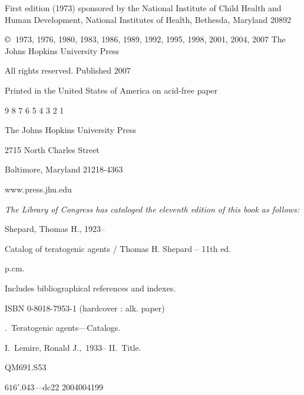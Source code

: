 \clearpage



\thispagestyle{empty}
\begingroup
\parindent0pt
\def\baselinestretch{1.15}
\mediumlarge
\vspace*{56pt}  %
First edition (1973) sponsored by the National Institute of 
Child Health and Human Development, National Institutes of Health,
Bethesda, Maryland 20892
\vspace{1pc}

$\copyright$\ 1973, 1976, 1980, 1983, 1986, 1989, 1992, 1995, 1998, 2001, 2004, 2007
The Johns Hopkins University Press

All rights reserved.  Published 2007

Printed in the United States of America on acid-free paper

9 8 7 6 5 4 3 2 1

\vspace{1pc}

The Johns Hopkins University Press

2715 North Charles Street

Baltimore, Maryland 21218-4363

www.press.jhu.edu

\vspace{1pc}

{\it The Library of Congress has cataloged the eleventh edition of this book as
follows: }

\vspace{4pt}

Shepard, Thomas H., 1923--

\emspace Catalog of teratogenic agents / Thomas H. Shepard -- 11th ed.

\emspace \emspace p.\emspace\emspace cm.

\emspace Includes bibliographical references and indexes.

\emspace ISBN 0-8018-7953-1 (hardcover : alk. paper)

.~Teratogenic agents---Catalogs.

                I.~Lemire, Ronald J.,~1933--
                II.~Title.

\emspace QM691.S53

\emspace $616'$.043---dc22 \hspace{3em} 2004004199

